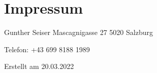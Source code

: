 \documentclass[letterpaper,10pt,ngerman]{sphinxmanual}
\begin{document}
\chapter{Impressum}
\label{\detokenize{impressum:impressum}}\label{\detokenize{impressum::doc}}
Gunther Seiser
Mascagnigasse 27
5020 Salzburg

Telefon: +43 699 8188 1989


Erstellt  am 20.03.2022



\renewcommand{\indexname}{Stichwortverzeichnis}
\printindex
\end{document}
